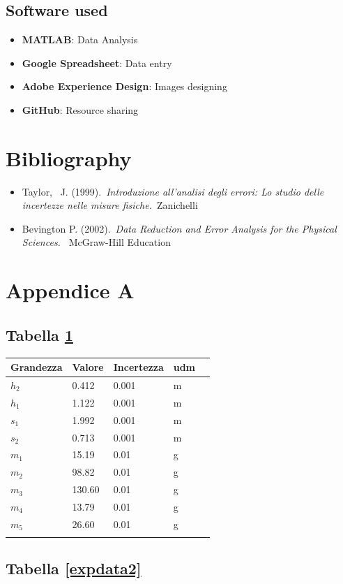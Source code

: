 \documentclass[11pt,a4paper]{article}
\begin{document}
\subsection{Software used}
\begin{itemize}
\item
  \textbf{MATLAB}: Data Analysis
\item
  \textbf{Google Spreadsheet}: Data entry
\item
  \textbf{Adobe Experience Design}: Images designing
\item
  \textbf{GitHub}: Resource sharing
\end{itemize}

\section{Bibliography}
\begin{itemize}
\item
  Taylor,~ J. (1999).~\emph{Introduzione all'analisi degli errori: Lo
  studio delle incertezze nelle misure fisiche.~}Zanichelli
\item
  Bevington P. (2002).~\emph{Data Reduction and Error Analysis for the
  Physical Sciences.~} McGraw-Hill Education ~
\end{itemize}

\section{Appendice A}
\subsection{Tabella \ref{expdata1}}

\begin{longtable}[]{@{}lllll@{}}
\toprule
Grandezza & Valore & Incertezza & udm \tabularnewline
\midrule
\endhead
$h_2$ & 0.412 & 0.001 & m \tabularnewline
$h_1$ & 1.122 & 0.001 & m \tabularnewline
$s_1$ & 1.992 & 0.001 & m \tabularnewline
$s_2$ & 0.713 & 0.001 & m \tabularnewline
$m_1$ & 15.19 & 0.01 & g \tabularnewline
$m_2$ & 98.82 & 0.01 & g \tabularnewline
$m_3$ & 130.60 & 0.01 & g \tabularnewline
$m_4$ & 13.79 & 0.01 & g \tabularnewline
$m_5$ & 26.60 & 0.01 & g \tabularnewline
\bottomrule
\label{expdata1}
\end{longtable}


\subsection{Tabella \ref{expdata2}}
\end{document}
